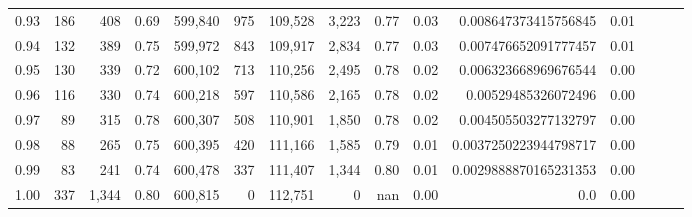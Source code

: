 \begin{tabular}{rrrrrrrrrrrrrrr}
0.93 &     186 &    408 &  0.69 &  599,840 &      975 &  109,528 &    3,223 &  0.77 &  0.03 &   0.008647373415756845 &      0.01 \\
0.94 &     132 &    389 &  0.75 &  599,972 &      843 &  109,917 &    2,834 &  0.77 &  0.03 &   0.007476652091777457 &      0.01 \\
0.95 &     130 &    339 &  0.72 &  600,102 &      713 &  110,256 &    2,495 &  0.78 &  0.02 &   0.006323668969676544 &      0.00 \\
0.96 &     116 &    330 &  0.74 &  600,218 &      597 &  110,586 &    2,165 &  0.78 &  0.02 &    0.00529485326072496 &      0.00 \\
0.97 &      89 &    315 &  0.78 &  600,307 &      508 &  110,901 &    1,850 &  0.78 &  0.02 &   0.004505503277132797 &      0.00 \\
0.98 &      88 &    265 &  0.75 &  600,395 &      420 &  111,166 &    1,585 &  0.79 &  0.01 &  0.0037250223944798717 &      0.00 \\
0.99 &      83 &    241 &  0.74 &  600,478 &      337 &  111,407 &    1,344 &  0.80 &  0.01 &  0.0029888870165231353 &      0.00 \\
1.00 &     337 &  1,344 &  0.80 &  600,815 &        0 &  112,751 &        0 &   nan &  0.00 &                    0.0 &      0.00 \\
\bottomrule
\end{tabular}
